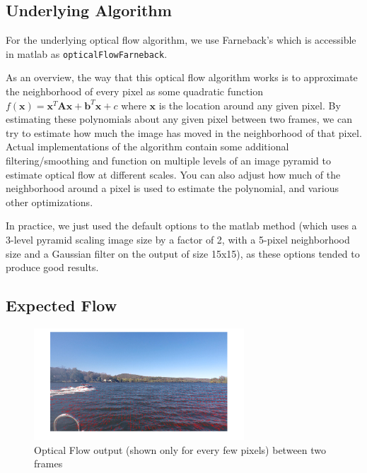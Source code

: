 \documentclass{article}
\begin{document}
\subsection{Underlying Algorithm}

For the underlying optical flow algorithm, we use Farneback's
\cite{farneback2003} which is accessible in matlab as
\texttt{opticalFlowFarneback}.

As an overview, the way that this optical flow algorithm works is to
approximate the neighborhood of every pixel as some quadratic function
$f(\mathbf{x}) = \mathbf{x}^T \mathbf{A} \mathbf{x} + \mathbf{b}^T \mathbf{x} + c$
where $\mathbf{x}$ is the location around any given pixel. By estimating these
polynomials about any given pixel between two frames, we can try to estimate how
much the image has moved in the neighborhood of that pixel. Actual
implementations of the algorithm contain some additional filtering/smoothing and
function on multiple levels of an image pyramid to estimate optical flow at
different scales. You can also adjust how much of the neighborhood around a
pixel is used to estimate the polynomial, and various other optimizations.

In practice, we just used the default options to the matlab method (which uses
a 3-level pyramid scaling image size by a factor of 2, with a 5-pixel
neighborhood size and a Gaussian filter on the output of size 15x15), as these
options tended to produce good results.

\subsection{Expected Flow}

\begin{figure}[H]
\centering
\includegraphics[width=0.7\textwidth]{example_flow.png}
\caption{Optical Flow output (shown only for every few pixels) between two
frames}
\label{fig:example_flow}
\end{figure}
\end{document}

